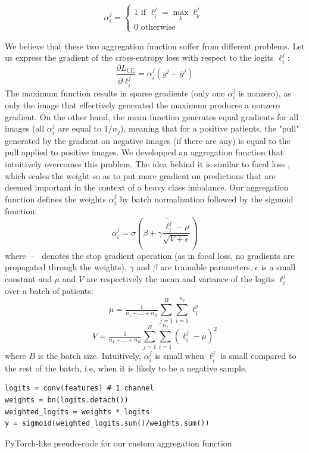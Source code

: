 \documentclass[final]{cvpr}
\begin{document}
	$$
	\alpha_i^j  = \left\{
	\begin{array}{ll}
		1 \text{ if } \ell_i^j = \max_k \ell_k^j  \\
		0 \text{ otherwise}
	\end{array}
	\right.
	$$
	
	\vspace{1mm}
	\noindent
	We believe that these two aggregation function suffer from different problems. Let us express the gradient of the cross-entropy loss with respect to the logits $\ell_i^j$:
	$$\frac{\partial L_{\text{CE}}}{\partial \ell_i^j} = \alpha_i^j \left(y^j - \bar{y}^j\right)$$
	The maximum function results in sparse gradients (only one $\alpha_i^j$ is nonzero), as only the image that effectively generated the maximum produces a nonzero gradient. On the other hand, the mean function generates equal gradients for all images (all $\alpha_i^j$ are equal to $1/n_j$), meaning that for a positive patients, the "pull" generated by the gradient on negative images (if there are any) is equal to the pull applied to positive images. We developped an aggregation function that intuitively overcomes this problem.
	The idea behind it is similar to focal loss \cite{focal}, which scales the weight so as to put more gradient on predictions that are deemed important in the context of a heavy class imbalance.
	Our aggregation function defines the weights $\alpha_i^j$ by batch normalization \cite{bn} followed by the sigmoid function:
	$$ \alpha_i^j = \sigma\left(\beta + \gamma \frac{\widetilde{\ell_i^j} - \mu}{\sqrt{V+\epsilon}}\right) $$
	where $\; \widetilde{\text{ }} \;$ denotes the stop gradient operation (as in focal loss, no gradients are propagated through the weights), $\gamma$ and $\beta$ are trainable parameters, $\epsilon$ is a small constant and $\mu$ and $V$ are respectively the mean and variance of the logits $\ell_i^j$ over a batch of patients:
	$$\mu = \tfrac 1 {n_1+\dots+n_B} \sum_{j=1}^{B} \sum_{i=1}^{n_j} \ell_i^j$$
	$$V = \tfrac 1 {n_1+\dots+n_B} \sum_{j=1}^{B} \sum_{i=1}^{n_j} \left(\ell_i^j - \mu \right)^2$$
	where $B$ is the batch size. Intuitively, $\alpha_i^j$ is small when $\ell_i^j$ is small compared to the rest of the batch, i.e, when it is likely to be a negative sample.
	
	\begin{table}[h]
		\renewcommand\tablename{Pseudo-code}
		\begin{Verbatim}[fontsize=\footnotesize, samepage=true, frame=single]
logits = conv(features) # 1 channel
weights = bn(logits.detach())
weighted_logits = weights * logits
y = sigmoid(weighted_logits.sum()/weights.sum())
		\end{Verbatim}
		\caption{PyTorch-like pseudo-code for our custom aggregation function}
		\label{alg2}
	\end{table}
	
\end{document}

